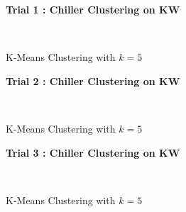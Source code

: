 \begin{figure}[!h]
\centerline{\bfseries\Large Trial 1 : Chiller Clustering on KW}\\
\caption{K-Means Clustering with $k=5$}
\end{figure}
\begin{figure}[!h]
\centerline{\bfseries\Large Trial 2 : Chiller Clustering on KW}\\
\caption{K-Means Clustering with $k=5$}
\end{figure}
\begin{figure}[!h]
\centerline{\bfseries\Large Trial 3 : Chiller Clustering on KW}\\
\caption{K-Means Clustering with $k=5$}
\end{figure}
